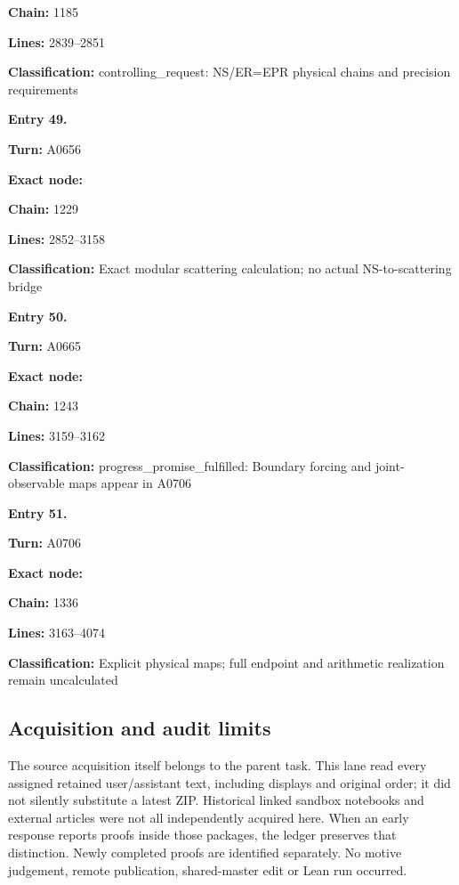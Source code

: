 \documentclass[10pt,a4paper,oneside]{report}
\begin{document}
\textbf{Chain:} 1185

\textbf{Lines:} 2839--2851

\textbf{Classification:} controlling\_request: NS/ER=EPR physical chains
and precision requirements


\textbf{Entry 49.}

\textbf{Turn:} A0656

\textbf{Exact node:} \protect{}

\textbf{Chain:} 1229

\textbf{Lines:} 2852--3158

\textbf{Classification:}
\protect{} Exact modular
scattering calculation; no actual NS-to-scattering bridge


\textbf{Entry 50.}

\textbf{Turn:} A0665

\textbf{Exact node:} \protect{}

\textbf{Chain:} 1243

\textbf{Lines:} 3159--3162

\textbf{Classification:} progress\_promise\_fulfilled: Boundary forcing
and joint-observable maps appear in A0706


\textbf{Entry 51.}

\textbf{Turn:} A0706

\textbf{Exact node:} \protect{}

\textbf{Chain:} 1336

\textbf{Lines:} 3163--4074

\textbf{Classification:}
\protect{} Explicit
physical maps; full endpoint and arithmetic realization remain
uncalculated

\subsection{Acquisition and audit
limits}\label{acquisition-and-audit-limits}

The source acquisition itself belongs to the parent task. This lane read
every assigned retained user/assistant text, including displays and
original order; it did not silently substitute a latest ZIP. Historical
linked sandbox notebooks and external articles were not all
independently acquired here. When an early response reports proofs
inside those packages, the ledger preserves that distinction. Newly
completed proofs are identified separately. No motive judgement, remote
publication, shared-master edit or Lean run occurred.
\end{document}
